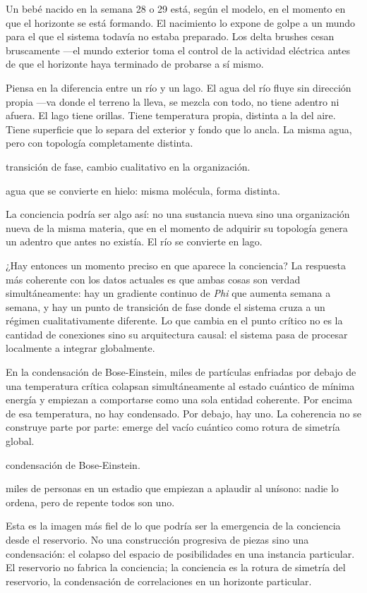 Un bebé nacido en la semana 28 o 29 está, según el modelo, en el momento en que el horizonte se está formando. El nacimiento lo expone de golpe a un mundo para el que el sistema todavía no estaba preparado. Los delta brushes cesan bruscamente —el mundo exterior toma el control de la actividad eléctrica antes de que el horizonte haya terminado de probarse a sí mismo.

\noindent Piensa en la diferencia entre un río y un lago. El agua del río fluye sin dirección propia —va donde el terreno la lleva, se mezcla con todo, no tiene adentro ni afuera. El lago tiene orillas. Tiene temperatura propia, distinta a la del aire. Tiene superficie que lo separa del exterior y fondo que lo ancla. La misma agua, pero con topología completamente distinta.

\begin{fisica}
 transición de fase, cambio cualitativo en la organización.

 agua que se convierte en hielo: misma molécula, forma distinta.
\end{fisica}
La conciencia podría ser algo así: no una sustancia nueva sino una organización nueva de la misma materia, que en el momento de adquirir su topología genera un adentro que antes no existía. El río se convierte en lago.

¿Hay entonces un momento preciso en que aparece la conciencia? La respuesta más coherente con los datos actuales es que ambas cosas son verdad simultáneamente: hay un gradiente continuo de \emph{Phi} que aumenta semana a semana, y hay un punto de transición de fase donde el sistema cruza a un régimen cualitativamente diferente. Lo que cambia en el punto crítico no es la cantidad de conexiones sino su arquitectura causal: el sistema pasa de procesar localmente a integrar globalmente.

\noindent En la condensación de Bose-Einstein, miles de partículas enfriadas por debajo de una temperatura crítica colapsan simultáneamente al estado cuántico de mínima energía y empiezan a comportarse como una sola entidad coherente. Por encima de esa temperatura, no hay condensado. Por debajo, hay uno. La coherencia no se construye parte por parte: emerge del vacío cuántico como rotura de simetría global.

\begin{fisica}
 condensación de Bose-Einstein.

 miles de personas en un estadio que empiezan a aplaudir al unísono: nadie lo ordena, pero de repente todos son uno.
\end{fisica}
Esta es la imagen más fiel de lo que podría ser la emergencia de la conciencia desde el reservorio. No una construcción progresiva de piezas sino una condensación: el colapso del espacio de posibilidades en una instancia particular. El reservorio no fabrica la conciencia; la conciencia es la rotura de simetría del reservorio, la condensación de correlaciones en un horizonte particular.


